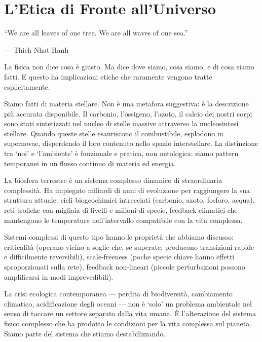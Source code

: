 \documentclass[12pt,a4paper,openany]{book}
\newcommand{\sezione}[1]{\vspace{1.2em}{\large\bfseries #1}\vspace{0.5em}\par}
\begin{document}
\chapter{L'Etica di Fronte all'Universo}

\epigraph{``We are all leaves of one tree. We are all waves of one sea.''}{--- Thich Nhat Hanh}

\sezione{Cosa la fisica dice sull'etica (e cosa non dice)}

La fisica non dice cosa è giusto. Ma dice dove siamo, cosa siamo, e di cosa siamo fatti. E questo ha implicazioni etiche che raramente vengono tratte esplicitamente.

Siamo fatti di materia stellare. Non è una metafora suggestiva: è la descrizione più accurata disponibile. Il carbonio, l'ossigeno, l'azoto, il calcio dei nostri corpi sono stati sintetizzati nel nucleo di stelle massive attraverso la nucleosintesi stellare. Quando queste stelle esauriscono il combustibile, esplodono in supernovae, disperdendo il loro contenuto nello spazio interstellare. La distinzione tra `noi' e `l'ambiente' è funzionale e pratica, non ontologica: siamo pattern temporanei in un flusso continuo di materia ed energia.

\sezione{La fisica dell'interdipendenza e la crisi ecologica}

La biosfera terrestre è un sistema complesso dinamico di straordinaria complessità. Ha impiegato miliardi di anni di evoluzione per raggiungere la sua struttura attuale: cicli biogeochimici intrecciati (carbonio, azoto, fosforo, acqua), reti trofiche con migliaia di livelli e milioni di specie, feedback climatici che mantengono le temperature nell'intervallo compatibile con la vita complessa.

Sistemi complessi di questo tipo hanno le proprietà che abbiamo discusso: criticalità (operano vicino a soglie che, se superate, producono transizioni rapide e difficilmente reversibili), scale-freeness (poche specie chiave hanno effetti sproporzionati sulla rete), feedback non-lineari (piccole perturbazioni possono amplificarsi in modi imprevedibili).

La crisi ecologica contemporanea --- perdita di biodiversità, cambiamento climatico, acidificazione degli oceani --- non è `solo' un problema ambientale nel senso di toccare un settore separato dalla vita umana. È l'alterazione del sistema fisico complesso che ha prodotto le condizioni per la vita complessa sul pianeta. Siamo parte del sistema che stiamo destabilizzando.
\end{document}
